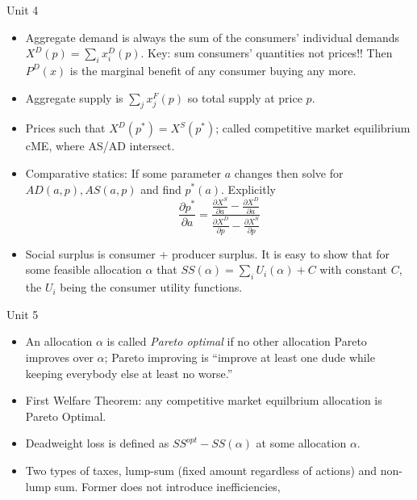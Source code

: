 \documentclass[10pt,twocolumn]{article}
\newcommand{\pd}[2]{\frac{\partial #1}{\partial#2}}
\begin{document}
Unit 4
\begin{itemize}
    \item Aggregate demand is always the sum of the consumers' individual demands $X^D(p) = \sum_i x^D_i(p)$. Key: sum consumers' quantities not prices!! Then $P^D(x)$ is the marginal benefit of any consumer buying any more.
    \item Aggregate supply is $\sum_j x^F_j(p)$ so total supply at price $p$.
    \item Prices such that $X^D(p^*) = X^S(p^*)$; called competitive market equilibrium cME, where AS/AD intersect. 
    \item Comparative statics: If some parameter $a$ changes then solve for $AD(a, p), AS(a, p)$ and find $p^*(a)$. Explicitly
        $$\pd{p^*}{a} = \frac{\pd{X^S}{a} - \pd{X^D}{a}}{\pd{X^D}{p} - \pd{X^S}{p}}$$
    \item Social surplus is consumer + producer surplus. It is easy to show that for some feasible allocation $\alpha$ that $SS(\alpha) = \sum_iU_i(\alpha) + C$ with constant $C$, the $U_i$ being the consumer utility functions.
\end{itemize}

Unit 5
\begin{itemize}
    \item An allocation $\alpha$ is called \emph{Pareto optimal} if no other allocation Pareto improves over $\alpha$; Pareto improving is ``improve at least one dude while keeping everybody else at least no worse.''
    \item First Welfare Theorem: any competitive market equilbrium allocation is Pareto Optimal.
    \item Deadweight loss is defined as $SS^{opt} - SS(\alpha)$ at some allocation $\alpha$.
    \item Two types of taxes, lump-sum (fixed amount regardless of actions) and non-lump sum. Former does not introduce inefficiencies, 
\end{itemize}
\end{document}
